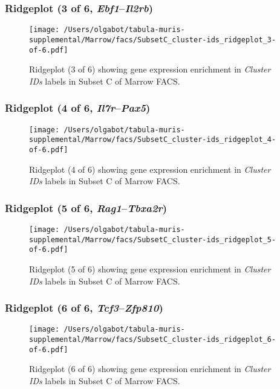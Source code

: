 \clearpage

\subsubsection{Ridgeplot (3 of 6, \emph{Ebf1}--\emph{Il2rb})}
\begin{figure}[h]
\centering
\texttt{[image: /Users/olgabot/tabula-muris-supplemental/Marrow/facs/SubsetC\_cluster-ids\_ridgeplot\_3-of-6.pdf]}

\caption{ Ridgeplot (3 of 6)  showing gene expression enrichment in \emph{Cluster IDs} labels in Subset C of Marrow FACS. }
\end{figure}


\clearpage

\subsubsection{Ridgeplot (4 of 6, \emph{Il7r}--\emph{Pax5})}
\begin{figure}[h]
\centering
\texttt{[image: /Users/olgabot/tabula-muris-supplemental/Marrow/facs/SubsetC\_cluster-ids\_ridgeplot\_4-of-6.pdf]}

\caption{ Ridgeplot (4 of 6)  showing gene expression enrichment in \emph{Cluster IDs} labels in Subset C of Marrow FACS. }
\end{figure}


\clearpage

\subsubsection{Ridgeplot (5 of 6, \emph{Rag1}--\emph{Tbxa2r})}
\begin{figure}[h]
\centering
\texttt{[image: /Users/olgabot/tabula-muris-supplemental/Marrow/facs/SubsetC\_cluster-ids\_ridgeplot\_5-of-6.pdf]}

\caption{ Ridgeplot (5 of 6)  showing gene expression enrichment in \emph{Cluster IDs} labels in Subset C of Marrow FACS. }
\end{figure}


\clearpage

\subsubsection{Ridgeplot (6 of 6, \emph{Tcf3}--\emph{Zfp810})}
\begin{figure}[h]
\centering
\texttt{[image: /Users/olgabot/tabula-muris-supplemental/Marrow/facs/SubsetC\_cluster-ids\_ridgeplot\_6-of-6.pdf]}

\caption{ Ridgeplot (6 of 6)  showing gene expression enrichment in \emph{Cluster IDs} labels in Subset C of Marrow FACS. }
\end{figure}


